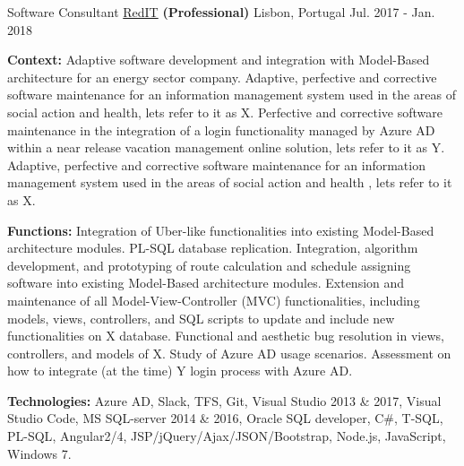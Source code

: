 \begin{cventries}
  \cventry
    {Software Consultant} %
    {\href{https://www.reditpro.com/}{RedIT} \textbf{(Professional)}} %
    {Lisbon, Portugal} %
    {Jul. 2017 - Jan. 2018} 
    {
      \begin{cvitems} %
		\item[] {\textbf{Context:} 
Adaptive software development and integration with Model-Based architecture for an energy sector company. %
Adaptive, perfective and corrective software maintenance for an information management system used in the areas of social action and health, %
lets refer to it as X. Perfective and corrective software maintenance in the integration of a login functionality managed by Azure AD within a near release vacation management online solution, lets refer to it as Y.
Adaptive, perfective and corrective software maintenance for an information management system used in the areas of social action and health %
, lets refer to it as X.}
		\item[] {\textbf{Functions:} Integration of Uber-like functionalities into existing Model-Based architecture modules. PL-SQL database replication. Integration, algorithm development, and prototyping of route calculation and schedule assigning software into existing Model-Based architecture modules.
		Extension and maintenance of all Model-View-Controller (MVC) functionalities, including models, views, controllers, and SQL scripts to update and include new functionalities on X database. Functional and aesthetic bug resolution in views, controllers, and models of X.
		Study of Azure AD usage scenarios. Assessment on how to integrate (at the time) Y login process with Azure AD.}		
		\item[] {\textbf{Technologies:} \textcolor{rainbowcolor-green}{Azure AD}, \textcolor{rainbowcolor-green}{Slack}, \textcolor{rainbowcolor-green}{TFS}, \textcolor{rainbowcolor-green}{Git}, \textcolor{rainbowcolor-green}{Visual Studio 2013 \& 2017}, \textcolor{rainbowcolor-green}{Visual Studio Code}, \textcolor{rainbowcolor-green}{MS SQL-server 2014 \& 2016}, \textcolor{rainbowcolor-green}{Oracle SQL developer}, \textcolor{rainbowcolor-indigo}{C\#}, \textcolor{rainbowcolor-indigo}{T-SQL}, \textcolor{rainbowcolor-indigo}{PL-SQL}, \textcolor{rainbowcolor-indigo}{Angular2/4}, \textcolor{rainbowcolor-indigo}{JSP/jQuery/Ajax/JSON/Bootstrap}, \textcolor{rainbowcolor-indigo}{Node.js}, \textcolor{rainbowcolor-indigo}{JavaScript}, \textcolor{rainbowcolor-orange}{Windows 7}.}	
      \end{cvitems}
    } 
    

\end{cventries}
